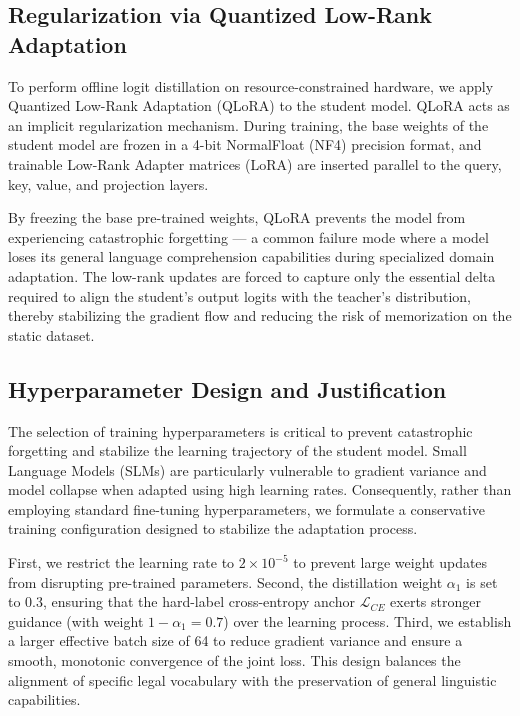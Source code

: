 

\subsection{Regularization via Quantized Low-Rank Adaptation}

To perform offline logit distillation on resource-constrained hardware, we apply Quantized Low-Rank Adaptation (QLoRA) to the student model. QLoRA acts as an implicit regularization mechanism. During training, the base weights of the student model are frozen in a 4-bit NormalFloat (NF4) precision format, and trainable Low-Rank Adapter matrices (LoRA) are inserted parallel to the query, key, value, and projection layers.

By freezing the base pre-trained weights, QLoRA prevents the model from experiencing catastrophic forgetting --- a common failure mode where a model loses its general language comprehension capabilities during specialized domain adaptation. The low-rank updates are forced to capture only the essential delta required to align the student's output logits with the teacher's distribution, thereby stabilizing the gradient flow and reducing the risk of memorization on the static dataset.

\subsection{Hyperparameter Design and Justification}

The selection of training hyperparameters is critical to prevent catastrophic forgetting and stabilize the learning trajectory of the student model. Small Language Models (SLMs) are particularly vulnerable to gradient variance and model collapse when adapted using high learning rates. Consequently, rather than employing standard fine-tuning hyperparameters, we formulate a conservative training configuration designed to stabilize the adaptation process.

First, we restrict the learning rate to $2 \times 10^{-5}$ to prevent large weight updates from disrupting pre-trained parameters. Second, the distillation weight $\alpha_1$ is set to $0.3$, ensuring that the hard-label cross-entropy anchor $\mathcal{L}_{CE}$ exerts stronger guidance (with weight $1 - \alpha_1 = 0.7$) over the learning process. Third, we establish a larger effective batch size of 64 to reduce gradient variance and ensure a smooth, monotonic convergence of the joint loss. This design balances the alignment of specific legal vocabulary with the preservation of general linguistic capabilities.

